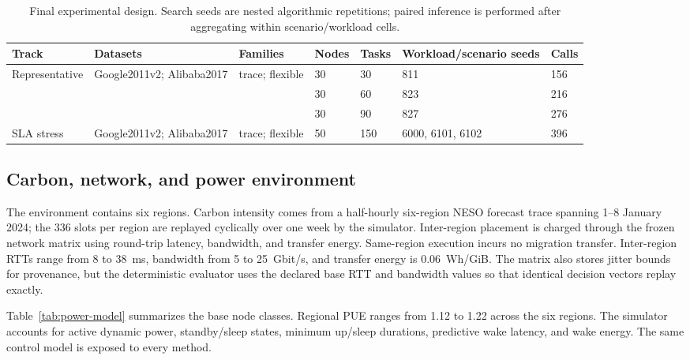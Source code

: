 \begin{table}[t]
\centering
\caption{Final experimental design. Search seeds are nested algorithmic repetitions; paired inference is performed after aggregating within scenario/workload cells.}
\label{tab:design}
\scriptsize
\setlength{\tabcolsep}{3pt}
\begin{tabularx}{\textwidth}{p{2.15cm}Y p{1.45cm}C{0.85cm}C{0.85cm}p{2.55cm}C{1.25cm}}
\toprule
Track & Datasets & Families & Nodes & Tasks & Workload/scenario seeds & Calls \\
\midrule
Representative & Google2011v2; Alibaba2017 & trace; flexible & 30 & 30 & 811 & 156 \\
 &  &  & 30 & 60 & 823 & 216 \\
 &  &  & 30 & 90 & 827 & 276 \\
SLA stress & Google2011v2; Alibaba2017 & trace; flexible & 50 & 150 & 6000, 6101, 6102 & 396 \\
\bottomrule
\end{tabularx}
\end{table}

\subsection{Carbon, network, and power environment}

The environment contains six regions. Carbon intensity comes from a half-hourly six-region NESO forecast trace spanning 1--8 January 2024; the 336 slots per region are replayed cyclically over one week by the simulator. Inter-region placement is charged through the frozen network matrix using round-trip latency, bandwidth, and transfer energy. Same-region execution incurs no migration transfer. Inter-region RTTs range from 8 to 38~ms, bandwidth from 5 to 25~Gbit/s, and transfer energy is 0.06~Wh/GiB. The matrix also stores jitter bounds for provenance, but the deterministic evaluator uses the declared base RTT and bandwidth values so that identical decision vectors replay exactly.

Table~\ref{tab:power-model} summarizes the base node classes. Regional PUE ranges from 1.12 to 1.22 across the six regions. The simulator accounts for active dynamic power, standby/sleep states, minimum up/sleep durations, predictive wake latency, and wake energy. The same control model is exposed to every method.

